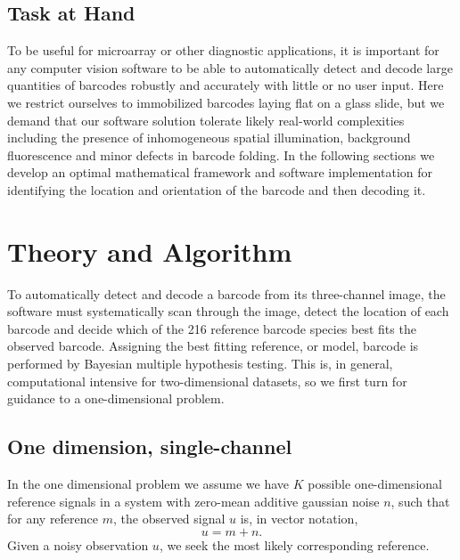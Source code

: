\subsection{Task at Hand}
To be useful for microarray or other diagnostic applications, it is important for any computer vision software to be able to automatically detect and decode large quantities of barcodes robustly and accurately with little or no user input. 
Here we restrict ourselves to immobilized barcodes laying flat on a glass slide, but we demand that our software solution tolerate  likely real-world complexities including the presence of inhomogeneous spatial illumination, background fluorescence and minor defects in barcode folding.  
In the following sections we develop an optimal mathematical framework and software implementation for identifying the location and orientation of the barcode and then decoding it.


\section{Theory and Algorithm}
To automatically detect and decode a barcode from its three-channel image, the software must systematically scan through the image, detect the location of each barcode and decide which of the 216 reference barcode species best fits the observed barcode. Assigning the best fitting reference, or model, barcode is performed by Bayesian multiple hypothesis testing. This is, in general, computational intensive for two-dimensional datasets, so we first turn for guidance to a one-dimensional problem.


\subsection{One dimension, single-channel}
In the one dimensional problem we assume we have $K$ possible one-dimensional reference signals in a system with zero-mean additive gaussian noise $n$, such that for any reference $m$, the observed signal $u$ is, in vector notation,
\begin{equation}
u=m + n.
\end{equation}
Given a noisy observation $u$, we seek the most likely corresponding reference. 



